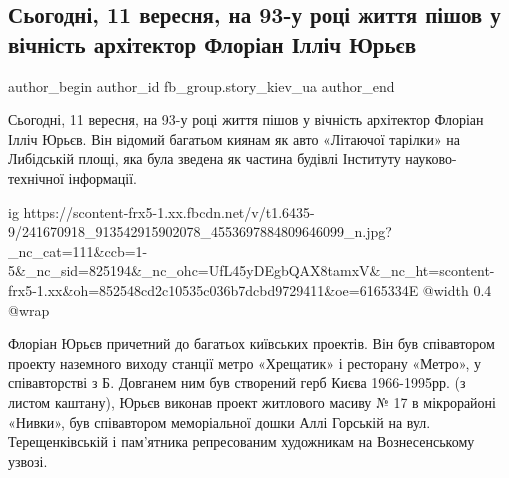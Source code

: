  
 
 
 
 
 
\subsection{Сьогодні, 11 вересня, на 93-у році життя пішов у вічність архітектор Флоріан Ілліч Юрьєв}
\label{sec:11_09_2021.fb.fb_group.story_kiev_ua.2.jurjev_florian_arhitektor_smert}
 
\ifcmt
 author_begin
   author_id fb_group.story_kiev_ua
 author_end
\fi

Сьогодні, 11 вересня, на 93-у році життя пішов у вічність архітектор Флоріан
Ілліч Юрьєв. Він відомий багатьом киянам як авто «Літаючої тарілки» на
Либідській площі, яка була зведена як частина будівлі Інституту
науково-технічної інформації. 

\ifcmt
  ig https://scontent-frx5-1.xx.fbcdn.net/v/t1.6435-9/241670918_913542915902078_4553697884809646099_n.jpg?_nc_cat=111&ccb=1-5&_nc_sid=825194&_nc_ohc=UfL45yDEgbQAX8tamxV&_nc_ht=scontent-frx5-1.xx&oh=852548cd2c10535c036b7dcbd9729411&oe=6165334E
  @width 0.4
  @wrap 
\fi

Флоріан Юрьєв причетний до багатьох київських проектів. Він був співавтором
проекту наземного виходу станції метро «Хрещатик» і ресторану «Метро», у
співавторстві з Б. Довганем ним був створений герб Києва 1966-1995рр. (з листом
каштану), Юрьєв виконав проект житлового масиву № 17 в мікрорайоні «Нивки», був
співавтором меморіальної дошки Аллі Горській на вул. Терещенківській і
пам’ятника репресованим художникам на Вознесенському узвозі.
